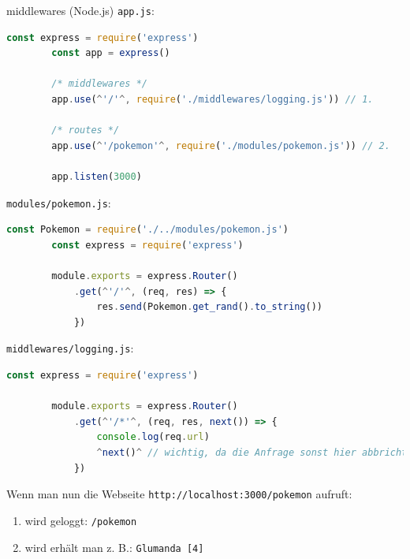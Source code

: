 \begin{example}{middlewares (Node.js)}
    \texttt{app.js}:
    \begin{lstlisting}[language=JavaScript]
        const express = require('express')
        const app = express()

        /* middlewares */
        app.use(^'/'^, require('./middlewares/logging.js')) // 1.
        
        /* routes */
        app.use(^'/pokemon'^, require('./modules/pokemon.js')) // 2.

        app.listen(3000)
    \end{lstlisting}

    \texttt{modules/pokemon.js}:
    \begin{lstlisting}[language=JavaScript]
        const Pokemon = require('./../modules/pokemon.js')
        const express = require('express')
        
        module.exports = express.Router()
            .get(^'/'^, (req, res) => {
                res.send(Pokemon.get_rand().to_string())
            })
    \end{lstlisting}

    \texttt{middlewares/logging.js}:
    \begin{lstlisting}[language=JavaScript]
        const express = require('express')
        
        module.exports = express.Router()
            .get(^'/*'^, (req, res, next()) => {
                console.log(req.url)
                ^next()^ // wichtig, da die Anfrage sonst hier abbricht
            })
    \end{lstlisting}

    Wenn man nun die Webseite \texttt{http://localhost:3000/pokemon} aufruft:
    \begin{enumerate}
        \item wird geloggt: \texttt{/pokemon}
        \item wird erhält man z. B.: \texttt{Glumanda [4]}
    \end{enumerate}
\end{example}